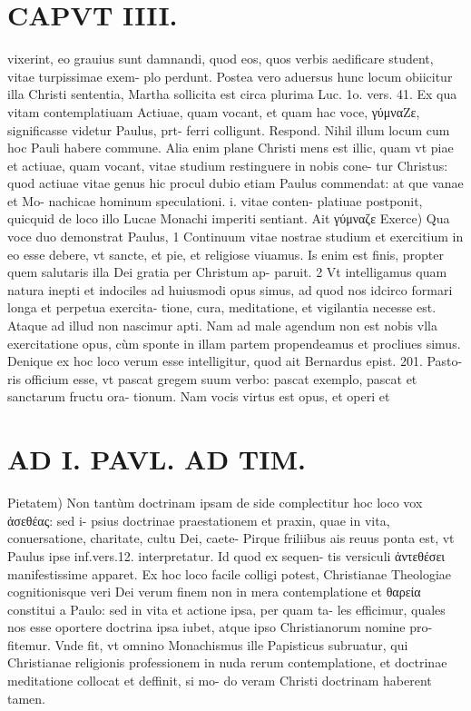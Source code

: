 \documentclass{article}
\begin{document}
\begin{pages}
\section*{CAPVT  IIII. }
\marginpar{[ p.205 ]}\pstart vixerint, eo grauius sunt damnandi, quod eos, quos verbis aedificare student, vitae turpissimae exem- plo perdunt. Postea vero aduersus hunc locum obiicitur illa Christi sententia, Martha sollicita est circa plurima Luc. 1o. vers. 41. Ex qua vitam contemplatiuam Actiuae, quam vocant, et quam hac voce, γύμναZε, significasse videtur Paulus, prt- ferri colligunt. Respond. Nihil illum locum cum hoc Pauli habere commune. Alia enim plane Christi mens est illic, quam vt piae et actiuae, quam vocant, vitae studium restinguere in nobis cone- tur Christus: quod actiuae vitae genus hic procul dubio etiam Paulus commendat: at que vanae et Mo- nachicae hominum speculationi. i. vitae conten- platiuae postponit, quicquid de loco illo Lucae Monachi imperiti sentiant.  \pend\pstart Ait γύμναζε Exerce) Qua voce duo demonstrat Paulus, 1 Continuum vitae nostrae studium et exercitium in eo esse debere, vt sancte, et pie, et religiose viuamus. Is enim est finis, propter quem salutaris illa Dei gratia per Christum ap- paruit. 2 Vt intelligamus quam natura inepti et indociles ad huiusmodi opus simus, ad quod nos idcirco formari longa et perpetua exercita- tione, cura, meditatione, et vigilantia necesse est. Ataque ad illud non nascimur apti. Nam ad male agendum non est nobis vlla exercitatione opus, cùm sponte in illam partem propendeamus et procliues simus. Denique ex hoc loco verum esse intelligitur, quod ait Bernardus epist. 201. Pasto- ris officium esse, vt pascat gregem suum verbo: pascat exemplo, pascat et sanctarum fructu ora- tionum. Nam vocis virtus est opus, et operi et  \pend
\section*{AD I. PAVL. AD TIM. }
\marginpar{[ p.206 ]}\pstart Pietatem) Non tantùm doctrinam ipsam de side complectitur hoc loco vox ἀσεθέας: sed i- psius doctrinae praestationem et praxin, quae in vita, conuersatione, charitate, cultu Dei, caete- Pirque friliibus ais reuus ponta est, vt Paulus ipse inf.vers.12. interpretatur. Id quod ex sequen- tis versiculi ἀντεθέσει manifestissime apparet.  \pend\pstart Ex hoc loco facile colligi potest, Christianae Theologiae cognitionisque veri Dei verum finem non in mera contemplatione et θαρεία constitui a Paulo: sed in vita et actione ipsa, per quam ta- les efficimur, quales nos esse oportere doctrina ipsa iubet, atque  ipso Christianorum nomine pro- fitemur. Vnde fit, vt omnino Monachismus ille Papisticus subruatur, qui Christianae religionis professionem in nuda rerum contemplatione, et doctrinae meditatione collocat et deffinit, si mo- do veram Christi doctrinam haberent tamen.  \pend
{}
{}

\end{pages}
\end{document}
